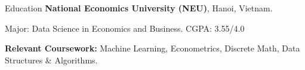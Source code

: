 \begin{rubric}{Education}
%
	\textbf{National Economics University (NEU)}, Hanoi, Vietnam.
	\par Major: Data Science in Economics and Business. \hfill CGPA: 3.55/4.0
	\par \textbf{Relevant Coursework:} Machine Learning, Econometrics, Discrete Math, Data Structures \& Algorithms.
\end{rubric}